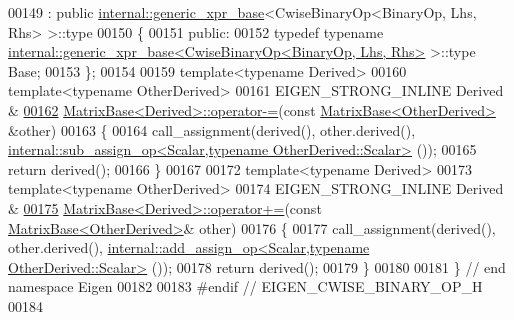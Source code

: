 \begin{DoxyCode}
00149   : \textcolor{keyword}{public} \hyperlink{struct_eigen_1_1internal_1_1generic__xpr__base}{internal::generic\_xpr\_base}<CwiseBinaryOp<BinaryOp, Lhs, Rhs> >::type
00150 \{
00151 \textcolor{keyword}{public}:
00152   \textcolor{keyword}{typedef} \textcolor{keyword}{typename} \hyperlink{struct_eigen_1_1internal_1_1generic__xpr__base}{internal::generic\_xpr\_base<CwiseBinaryOp<BinaryOp, Lhs, Rhs>}
       >::type Base;
00153 \};
00154 
00159 \textcolor{keyword}{template}<\textcolor{keyword}{typename} Derived>
00160 \textcolor{keyword}{template}<\textcolor{keyword}{typename} OtherDerived>
00161 EIGEN\_STRONG\_INLINE Derived &
\hyperlink{group___core___module_ae3955c1440eacc31034a9b0ba61bd055}{00162} \hyperlink{group___core___module_class_eigen_1_1_matrix_base}{MatrixBase<Derived>::operator-=}(\textcolor{keyword}{const} 
      \hyperlink{group___core___module_class_eigen_1_1_matrix_base}{MatrixBase<OtherDerived>} &other)
00163 \{
00164   call\_assignment(derived(), other.derived(), 
      \hyperlink{struct_eigen_1_1internal_1_1sub__assign__op}{internal::sub\_assign\_op<Scalar,typename OtherDerived::Scalar>}
      ());
00165   \textcolor{keywordflow}{return} derived();
00166 \}
00167 
00172 \textcolor{keyword}{template}<\textcolor{keyword}{typename} Derived>
00173 \textcolor{keyword}{template}<\textcolor{keyword}{typename} OtherDerived>
00174 EIGEN\_STRONG\_INLINE Derived &
\hyperlink{group___core___module_af8c1c2392d6d04b552a478ec3f82c511}{00175} \hyperlink{group___core___module_class_eigen_1_1_matrix_base}{MatrixBase<Derived>::operator+=}(\textcolor{keyword}{const} 
      \hyperlink{group___core___module_class_eigen_1_1_matrix_base}{MatrixBase<OtherDerived>}& other)
00176 \{
00177   call\_assignment(derived(), other.derived(), 
      \hyperlink{struct_eigen_1_1internal_1_1add__assign__op}{internal::add\_assign\_op<Scalar,typename OtherDerived::Scalar>}
      ());
00178   \textcolor{keywordflow}{return} derived();
00179 \}
00180 
00181 \} \textcolor{comment}{// end namespace Eigen}
00182 
00183 \textcolor{preprocessor}{#endif // EIGEN\_CWISE\_BINARY\_OP\_H}
00184 
\end{DoxyCode}
